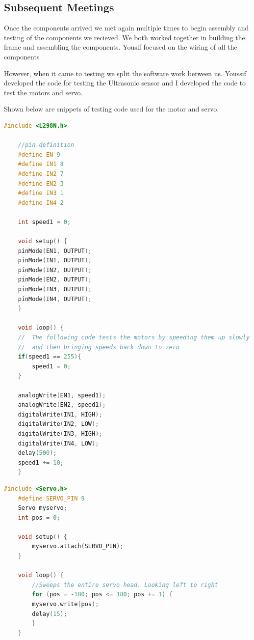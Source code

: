 \documentclass[a4paper, 12pt]{article}
\begin{document}
    \subsection{Subsequent Meetings}

    Once the components arrived we met again multiple times to begin assembly and testing
    of the components we recieved. We both worked together in building the frame and assembling the components. Yousif focused on the wiring of all the components

    However, when it came to testing we split the software work between us. Youssif developed the code for testing the Ultrasonic sensor and I developed the code to test the motors and servo.

    Shown below are snippets of testing code used for the motor and servo.

    \begin{lstlisting}[language=C++, caption=MotorTest Code]
    #include <L298N.h>

    //pin definition
    #define EN 9
    #define IN1 8
    #define IN2 7
    #define EN2 3
    #define IN3 1
    #define IN4 2

    int speed1 = 0;

    void setup() {
    pinMode(EN1, OUTPUT);
    pinMode(IN1, OUTPUT);
    pinMode(IN2, OUTPUT);
    pinMode(EN2, OUTPUT);
    pinMode(IN3, OUTPUT);
    pinMode(IN4, OUTPUT);
    }

    void loop() {
    //  The following code tests the motors by speeding them up slowly
    //  and then bringing speeds back down to zero
    if(speed1 == 255){
        speed1 = 0;
    }
    
    analogWrite(EN1, speed1);
    analogWrite(EN2, speed1);
    digitalWrite(IN1, HIGH);
    digitalWrite(IN2, LOW);
    digitalWrite(IN3, HIGH);
    digitalWrite(IN4, LOW);
    delay(500);
    speed1 += 10;
    }\end{lstlisting}  

    \begin{lstlisting}[language=C++, caption=ServoTest Code]
    #include <Servo.h>
    #define SERVO_PIN 9
    Servo myservo;     
    int pos = 0;
    
    void setup() {
        myservo.attach(SERVO_PIN); 
    }
    
    void loop() {
        //Sweeps the entire servo head. Looking left to right
        for (pos = -180; pos <= 180; pos += 1) {
        myservo.write(pos);              
        delay(15);                     
        }
    }\end{lstlisting}
\end{document}
